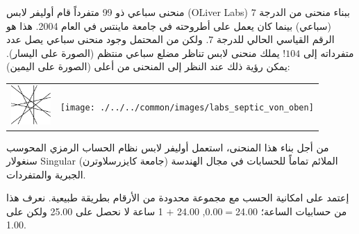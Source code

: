 \begin{surferPage}{منحنى سباعي ذو 99 متفرداً}
      قام أوليفر لابس
      \textenglish{(OLiver Labs)}
       ببناء منحنى من الدرجة $7$ (سباعي) بينما كان يعمل على أطروحته في جامعة ماينتس في العام 2004. هذا هو الرقم القياسي الحالي للدرجة $7$. ولكن من المحتمل وجود منحنى سباعي يصل عدد متفرداته إلى $104$!
    يملك منحنى لابس تناظر مضلع سباعي منتظم (الصورة على اليسار). يمكن رؤية ذلك عند النظر إلى المنحنى من أعلى (الصورة على اليمين):

    \vspace*{-0.3em}
    \begin{center}
      \begin{tabular}{c@{\qquad}c}
        \includegraphics[height=1.5cm]{./../../common/images/labsseptic1.pdf}
        &
        \texttt{[image: ./../../common/images/labs\_septic\_von\_oben]}
      \end{tabular}
    \end{center}
    \vspace*{-0.3em}

    من أجل بناء هذا المنحنى، استعمل أوليفر لابس نظام الحساب الرمزي المحوسب سنغولار {\sc Singular} (جامعة كايزرسلاوترن) الملائم تماماً للحسابات في مجال الهندسة الجبرية والمتفردات.

    إعتمد على امكانية الحسب مع مجموعة محدودة من الأرقام بطريقة طبيعية. نعرف هذا من حسابيات الساعة؛ 24.00$=$0.00, 24.00 $+$ 1 ساعة لا نحصل على 25.00 ولكن على 1.00.
\end{surferPage}
